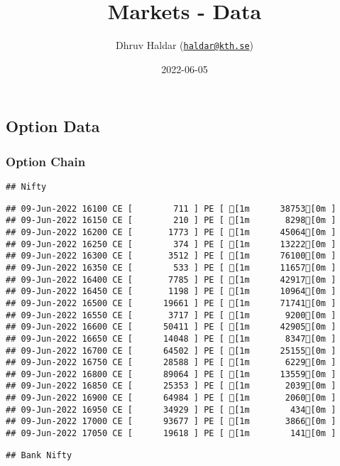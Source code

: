 \documentclass[
]{article}
\title{Markets - Data}
\author{Dhruv Haldar
(\href{mailto:haldar@kth.se}{\nolinkurl{haldar@kth.se}})}
\date{2022-06-05}
\begin{document}
\maketitle

\hypertarget{option-data}{%
\subsection{\texorpdfstring{ Option
Data}{ Option Data}}\label{option-data}}

\hypertarget{option-chain}{%
\subsubsection{Option Chain}\label{option-chain}}

\begin{verbatim}
## Nifty
\end{verbatim}

\begin{verbatim}
## 09-Jun-2022 16100 CE [        711 ] PE [ [1m      38753[0m ]
## 09-Jun-2022 16150 CE [        210 ] PE [ [1m       8298[0m ]
## 09-Jun-2022 16200 CE [       1773 ] PE [ [1m      45064[0m ]
## 09-Jun-2022 16250 CE [        374 ] PE [ [1m      13222[0m ]
## 09-Jun-2022 16300 CE [       3512 ] PE [ [1m      76100[0m ]
## 09-Jun-2022 16350 CE [        533 ] PE [ [1m      11657[0m ]
## 09-Jun-2022 16400 CE [       7785 ] PE [ [1m      42917[0m ]
## 09-Jun-2022 16450 CE [       1198 ] PE [ [1m      10964[0m ]
## 09-Jun-2022 16500 CE [      19661 ] PE [ [1m      71741[0m ]
## 09-Jun-2022 16550 CE [       3717 ] PE [ [1m       9200[0m ]
## 09-Jun-2022 16600 CE [      50411 ] PE [ [1m      42905[0m ]
## 09-Jun-2022 16650 CE [      14048 ] PE [ [1m       8347[0m ]
## 09-Jun-2022 16700 CE [      64502 ] PE [ [1m      25155[0m ]
## 09-Jun-2022 16750 CE [      28588 ] PE [ [1m       6229[0m ]
## 09-Jun-2022 16800 CE [      89064 ] PE [ [1m      13559[0m ]
## 09-Jun-2022 16850 CE [      25353 ] PE [ [1m       2039[0m ]
## 09-Jun-2022 16900 CE [      64984 ] PE [ [1m       2060[0m ]
## 09-Jun-2022 16950 CE [      34929 ] PE [ [1m        434[0m ]
## 09-Jun-2022 17000 CE [      93677 ] PE [ [1m       3866[0m ]
## 09-Jun-2022 17050 CE [      19618 ] PE [ [1m        141[0m ]
\end{verbatim}

\begin{verbatim}
## Bank Nifty
\end{verbatim}
\end{document}
